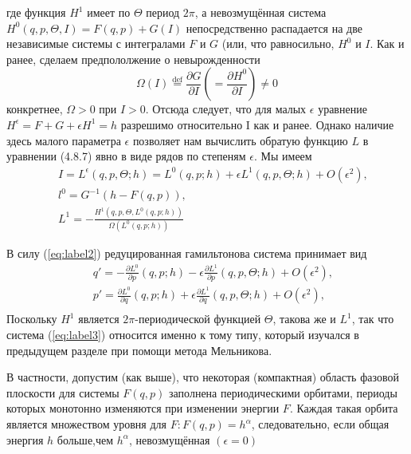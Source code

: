 \documentclass[twoside, a4paper]{article}
\begin{document}
где функция $ H^1 $ имеет по $\Theta$ период $ 2\pi $, а невозмущённая система $H^0(q,p,\Theta,I)=F(q,p)+G(I)$ непосредственно распадается на две независимые системы с интегралами $F$ и $G$ (или, что равносильно, $H^0$ и $I$. Как и ранее, сделаем предпололжение о невырожденности
\newcommand*{\defeq}{\stackrel{\text{def}}{=}}
\begin{equation}
\Omega(I) \defeq \frac{\partial G}{\partial I} \left(=\frac{\partial H^0}{\partial I}\right) \neq 0
\end{equation}
конкретнее, $\Omega>0$ при $I>0$. Отсюда следует, что для малых $\epsilon$ уравнение $H^\epsilon = F+G+\epsilon H^1=h$ разрешимо относительно I как и ранее. Однако наличие здесь малого параметра $\epsilon$ позволяет нам вычислить обратую функцию $L$ в уравнении (4.8.7) %
явно в виде рядов по степеням $\epsilon$. Мы имеем 
\begin{equation}
\text{~}\begin{aligned}
&I=L^\epsilon (q,p,\Theta;h) = L^0(q,p;h)+\epsilon L^1(q,p,\Theta;h) + O(\epsilon^2),\\
&l^0=G^{-1}(h-F(q,p)),\\
&L^1=-\frac{H^1(q,p,\Theta,L^0(q,p;h))}{\Omega(L^0(q,p;h))}
\end{aligned}
\label{eq:label2}
\end{equation}

В силу (\ref{eq:label2}) редуцированная гамильтонова система принимает вид
\begin{equation}
\text{~}\begin{aligned}
&q'=-\frac{\partial L^0}{\partial p}(q,p;h)-\epsilon\frac{\partial L^1}{\partial p}(q,p,\Theta;h)+O(\epsilon^2),\\
&p'=\frac{\partial L^0}{\partial q}(q,p;h)+\epsilon\frac{\partial L^1}{\partial q}(q,p,\Theta;h)+O(\epsilon^2),\\
\end{aligned}
\label{eq:label3}
\end{equation}
Поскольку $H^1$ является $2\pi$-периодической функцией $\Theta$, такова же и $L^1$, так что система (\ref{eq:label3}) относится именно к тому типу, который изучался в предыдущем разделе при помощи метода Мельникова.

В частности, допустим (как выше), что некоторая (компактная) область фазовой плоскости для системы $F(q,p)$ заполнена периодическими орбитами, периоды которых монотонно изменяются при изменении энергии $F$. Каждая такая орбита является множеством уровня для $F:F(q,p)=h^\alpha$, следовательно, если общая энергия $h$ больше,чем $h^\alpha$, невозмущённая $(\epsilon=0)$
\end{document}
